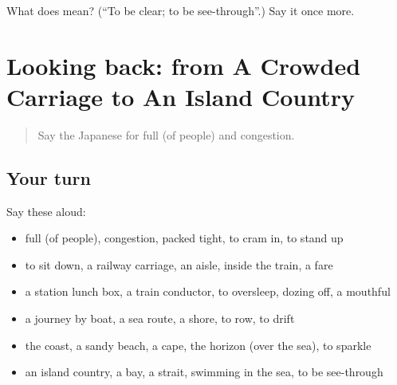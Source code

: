 \begin{tcolorbox}[breakable,colback=teal!4,colframe=teal!35!black,title={Before you move on}]
What does  mean? (\textquotedblleft{}To be clear; to be see-through\textquotedblright{}.) Say it once more.
\end{tcolorbox}
\section[(dialogue)]{Looking back: from A Crowded Carriage to An Island Country}

\label{lesson:JA-R383-review-378-383}



\begin{quote}
Say the Japanese for full (of people) and congestion.
\end{quote}

\subsection*{Your turn}
Say these aloud:

\begin{itemize}
\raggedright
  \item full (of people), congestion, packed tight, to cram in, to stand up
  \item to sit down, a railway carriage, an aisle, inside the train, a fare
  \item a station lunch box, a train conductor, to oversleep, dozing off, a mouthful
  \item a journey by boat, a sea route, a shore, to row, to drift
  \item the coast, a sandy beach, a cape, the horizon (over the sea), to sparkle
  \item an island country, a bay, a strait, swimming in the sea, to be see-through
\end{itemize}

